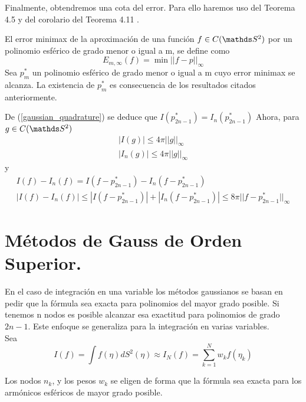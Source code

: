 Finalmente, obtendremos una cota del error. Para ello haremos uso del Teorema 4.5 \cite[p.142]{libro_esfarm} y del corolario del Teorema 4.11 \cite[p.149]{libro_esfarm}.
\medskip

El error minimax de la aproximación de una función $f\in C(\esfera)$ por un polinomio esférico de grado menor o igual a m, se define como 
$$
E_{m,\infty}(f) = \min ||f-p||_{\infty}
$$
Sea $p_m^*$ un polinomio esférico de grado menor o igual a m cuyo error minimax se alcanza. La existencia de $p_m^*$ es consecuencia de los resultados citados anteriormente.
\medskip

De (\ref{gaussian_quadrature}) se deduce que $I(p_{2n-1}^*)=I_n(p_{2n-1}^*)$
Ahora, para $g\in C(\esfera)$
\begin{gather}
|I(g)| \le 4\pi||g||_\infty \\
|I_n(g)|\le 4\pi||g||_\infty
\end{gather}
y
\begin{gather}
I(f) - I_n(f) = I(f-p^*_{2n-1}) - I_n(f-p^*_{2n-1}) \\
|I(f) - I_n(f)| \le | I(f-p^*_{2n-1}) | + |  I_n(f-p^*_{2n-1}) | \le 8\pi||f-p^*_{2n-1}||_\infty
\end{gather}
\section{Métodos de Gauss de Orden Superior.}

En el caso de integración en una variable los métodos gaussianos se basan en pedir que la fórmula sea exacta para polinomios del mayor grado posible. Si tenemos n nodos es posible alcanzar esa exactitud para polinomios de grado $2n-1$. Este enfoque se generaliza para la integración en varias variables. \\
Sea $$
I(f)= \int f(\eta)dS^2(\eta) \approx I_N(f) = \sum_{k=1}^{N} w_kf(\eta_k)$$

Los nodos ${n_k}$, y los pesos ${w_k}$ se eligen de forma que la fórmula sea exacta para los armónicos esféricos de mayor grado posible.

